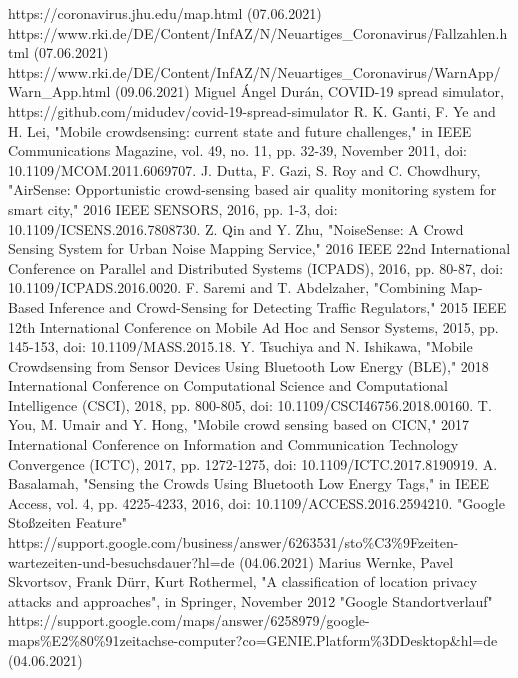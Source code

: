 \documentclass[conference]{IEEEtran}
\begin{document}
\begin{thebibliography}{00}
 https://coronavirus.jhu.edu/map.html (07.06.2021)
 https://www.rki.de/DE/Content/InfAZ/N/Neuartiges\_Coronavirus/Fallzahlen.html (07.06.2021)
 https://www.rki.de/DE/Content/InfAZ/N/Neuartiges\_Coronavirus/WarnApp/Warn\_App.html (09.06.2021)
 Miguel Ángel Durán, COVID-19 spread simulator, 
https://github.com/midudev/covid-19-spread-simulator
 R. K. Ganti, F. Ye and H. Lei, "Mobile crowdsensing: current state and future challenges," in IEEE Communications Magazine, vol. 49, no. 11, pp. 32-39, November 2011, doi: 10.1109/MCOM.2011.6069707.
 J. Dutta, F. Gazi, S. Roy and C. Chowdhury, "AirSense: Opportunistic crowd-sensing based air quality monitoring system for smart city," 2016 IEEE SENSORS, 2016, pp. 1-3, doi: 10.1109/ICSENS.2016.7808730.
 Z. Qin and Y. Zhu, "NoiseSense: A Crowd Sensing System for Urban Noise Mapping Service," 2016 IEEE 22nd International Conference on Parallel and Distributed Systems (ICPADS), 2016, pp. 80-87, doi: 10.1109/ICPADS.2016.0020.
 F. Saremi and T. Abdelzaher, "Combining Map-Based Inference and Crowd-Sensing for Detecting Traffic Regulators," 2015 IEEE 12th International Conference on Mobile Ad Hoc and Sensor Systems, 2015, pp. 145-153, doi: 10.1109/MASS.2015.18.
 Y. Tsuchiya and N. Ishikawa, "Mobile Crowdsensing from Sensor Devices Using Bluetooth Low Energy (BLE)," 2018 International Conference on Computational Science and Computational Intelligence (CSCI), 2018, pp. 800-805, doi: 10.1109/CSCI46756.2018.00160.
 T. You, M. Umair and Y. Hong, "Mobile crowd sensing based on CICN," 2017 International Conference on Information and Communication Technology Convergence (ICTC), 2017, pp. 1272-1275, doi: 10.1109/ICTC.2017.8190919.
 A. Basalamah, "Sensing the Crowds Using Bluetooth Low Energy Tags," in IEEE Access, vol. 4, pp. 4225-4233, 2016, doi: 10.1109/ACCESS.2016.2594210.
 "Google Stoßzeiten Feature" \\ https://support.google.com/business/answer/6263531/sto\%C3\%9Fzeiten-wartezeiten-und-besuchsdauer?hl=de (04.06.2021)
 Marius Wernke, Pavel Skvortsov, Frank Dürr, Kurt Rothermel,  "A classification of location privacy attacks and approaches", in Springer, November 2012
 "Google Standortverlauf" \\ https://support.google.com/maps/answer/6258979/google-maps\%E2\%80\%91zeitachse-computer?co=GENIE.Platform\%3DDesktop\&hl=de (04.06.2021)

\end{thebibliography}
\end{document}

